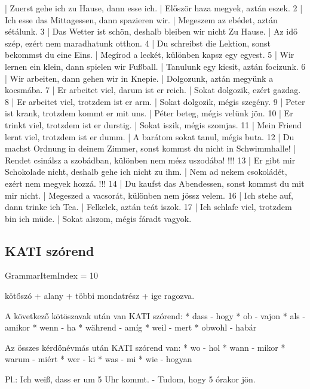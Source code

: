 \documentclass{article}
\newenvironment{desc}{\verbatim}{\endverbatim}
\newenvironment{exmp}{\verbatim}{\endverbatim}
\begin{document}
\begin{exmp}
1 | Zuerst gehe ich zu Hause, dann esse ich. | Először haza megyek, aztán eszek.
2 | Ich esse das Mittagessen, dann spazieren wir. | Megeszem az ebédet, aztán sétálunk.
3 | Das Wetter ist schön, deshalb bleiben wir nicht Zu Hause. | Az idő szép, ezért nem maradhatunk otthon.
4 | Du schreibst die Lektion, sonst bekommst du eine Eins. | Megírod a leckét, különben kapsz egy egyest.
5 | Wir lernen ein klein, dann spielen wir Fußball. | Tanulunk egy kicsit, aztán focizunk.
6 | Wir arbeiten, dann gehen wir in Knepie. | Dolgozunk, aztán megyünk a kocsmába.
7 | Er arbeitet viel, darum ist er reich. | Sokat dolgozik, ezért gazdag.
8 | Er arbeitet viel, trotzdem ist er arm. | Sokat dolgozik, mégis szegény.
9 | Peter ist krank, trotzdem kommt er mit uns. | Péter beteg, mégis velünk jön.
10 | Er trinkt viel, trotzdem ist er durstig. | Sokat iszik, mégis szomjas.
11 | Mein Friend lernt viel, trotzdem ist er dumm. | A barátom sokat tanul, mégis buta.
12 | Du machst Ordnung in deinem Zimmer, sonst kommst du nicht in Schwimmhalle! | Rendet csinálsz a szobádban, különben nem mész uszodába! !!!
13 | Er gibt mir Schokolade nicht, deshalb gehe ich nicht zu ihm. | Nem ad nekem csokoládét, ezért nem megyek hozzá. !!!
14 | Du kaufst das Abendessen, sonst kommst du mit mir nicht. | Megeszed a vacsorát, különben nem jössz velem.
16 | Ich stehe auf, dann trinke ich Tea. | Felkelek, aztán teát iszok.
17 | Ich schlafe viel, trotzdem bin ich müde. | Sokat alszom, mégis fáradt vagyok.
\end{exmp}

\subsection{KATI szórend}

GrammarItemIndex = 10

\begin{desc}
kötőszó + alany + többi mondatrész + ige ragozva.

A következő kötöszavak után van KATI szórend:
* dass - hogy
* ob - vajon
* als - amikor
* wenn - ha
* während - amíg
* weil - mert
* obwohl - habár

Az összes kérdőnévmás után KATI szórend van:
* wo - hol
* wann - mikor
* warum - miért
* wer - ki
* was - mi
* wie - hogyan

Pl.: Ich weiß, dass er um 5 Uhr kommt. - Tudom, hogy 5 órakor jön.
\end{desc}
\end{document}
